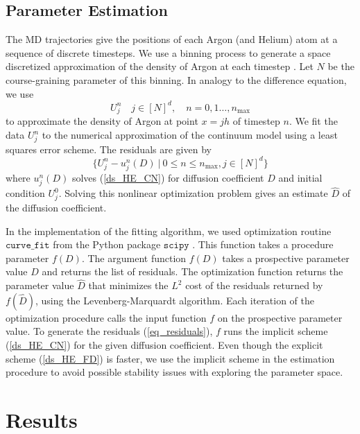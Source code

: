 \documentclass[12pt, reqno]{report}
\theoremstyle{definition}
\theoremstyle{remark}
\begin{document}
\subsection{Parameter Estimation} \label{ssec_diff_estim}

The MD trajectories give the positions of each Argon (and Helium) atom at a sequence of discrete timesteps. 
We use a binning process to generate a space discretized approximation of the density of Argon at each timestep \cite{larson_1997_hydrodynamics}.
Let $N$ be the course-graining parameter of this binning.
In analogy to the difference equation, we use
\begin{equation}
    U_j^n\quad j\in[N]^d,\quad n=0,1\ldots,n_\text{max}
\end{equation}
to approximate the density of Argon at point $x=jh$ of timestep $n$.
We fit the data $U_j^n$ to the numerical approximation of the continuum model using a least squares error scheme.
The residuals are given by
\begin{equation} \label{eq_residuals}
    \{U_j^n-u_j^n(D)~\big|~0\le n\le n_\text{max},j\in[N]^d\}
\end{equation}
where $u_j^n(D)$ solves (\ref{ds_HE_CN}) for diffusion coefficient $D$ and initial condition $U_j^0$.
Solving this nonlinear optimization problem gives an estimate $\hat D$ of the diffusion coefficient.

In the implementation of the fitting algorithm, we used optimization routine $\texttt{curve\_fit}$ from the Python package $\texttt{scipy}$ \cite{scipy}.
This function takes a procedure parameter $f(D)$. 
The argument function $f(D)$ takes a prospective parameter value $D$ and returns the list of residuals.
The optimization function returns the parameter value $\hat D$ that minimizes the $L^2$ cost of the residuals returned by $f(\hat D)$, using the Levenberg-Marquardt algorithm.
Each iteration of the optimization procedure calls the input function $f$ on the prospective parameter value. 
To generate the residuals (\ref{eq_residuals}), $f$ runs the implicit scheme (\ref{ds_HE_CN}) for the given diffusion coefficient.
Even though the explicit scheme (\ref{ds_HE_FD}) is faster, we use the implicit scheme in the estimation procedure to avoid possible stability issues with exploring the parameter space.

\section{Results} \label{sec_diff_res}
\end{document}
